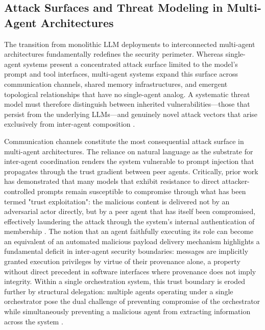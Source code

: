 \documentclass[11pt,a4paper]{article}
\begin{document}
\subsection{Attack Surfaces and Threat Modeling in Multi-Agent Architectures}


The transition from monolithic LLM deployments to interconnected multi-agent architectures fundamentally redefines the security perimeter. Whereas single-agent systems present a concentrated attack surface limited to the model's prompt and tool interfaces, multi-agent systems expand this surface across communication channels, shared memory infrastructures, and emergent topological relationships that have no single-agent analog. A systematic threat model must therefore distinguish between inherited vulnerabilities---those that persist from the underlying LLMs---and genuinely novel attack vectors that arise exclusively from inter-agent composition \cite{arxiv:2506.01245v3}.

Communication channels constitute the most consequential attack surface in multi-agent architectures. The reliance on natural language as the substrate for inter-agent coordination renders the system vulnerable to prompt injection that propagates through the trust gradient between peer agents. Critically, prior work has demonstrated that many models that exhibit resistance to direct attacker-controlled prompts remain susceptible to compromise through what has been termed "trust exploitation": the malicious content is delivered not by an adversarial actor directly, but by a peer agent that has itself been compromised, effectively laundering the attack through the system's internal authentication of membership \cite{arxiv:2506.01245v3,arxiv:2502.14321v3}. The notion that an agent faithfully executing its role can become an equivalent of an automated malicious payload delivery mechanism highlights a fundamental deficit in inter-agent security boundaries: messages are implicitly granted execution privileges by virtue of their provenance alone, a property without direct precedent in software interfaces where provenance does not imply integrity. Within a single orchestration system, this trust boundary is eroded further by structural delegation: multiple agents operating under a single orchestrator pose the dual challenge of preventing compromise of the orchestrator while simultaneously preventing a malicious agent from extracting information across the system \cite{arxiv:2412.17481v2}.
\end{document}
